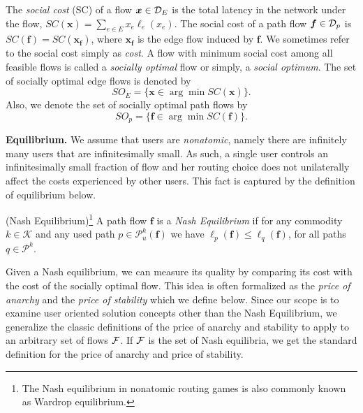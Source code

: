 \begin{definition}
The \emph{social cost} (SC) of a flow $\bm{x} \in \mathcal{D}_E$ is the total latency in the network under the flow, $SC(\bm{x})=\sum_{e\in E}x_e \ell_{e}(x_e)$. The social cost of a path flow $\bm{f} \in \mathcal{D}_p$ is $SC(\bm{f})=SC(\bm{x_f})$, where $\bm{x_f}$ is the edge flow induced by $\bm{f}$.  We sometimes refer to the social cost simply as {\em cost}.
A flow with minimum social cost among all feasible flows is called a \emph{socially optimal} flow or simply, a \emph{social optimum}.  The set of socially optimal edge flows is denoted by 
$$SO_E = \{\bm{x} \in \arg\min SC(\bm{x}) \}.$$
Also, we denote the set of socially optimal path flows by
$$ SO_p= \{\bm{f} \in \arg\min SC(\bm{f}) \}.$$
\end{definition}

\smallskip\noindent 
\textbf{Equilibrium.} We assume that users are {\em nonatomic}, namely there are infinitely many users that are infinitesimally small.  As such, a single user controls an infinitesimally small fraction of flow and her routing choice does not unilaterally affect the costs experienced by other users.  This fact is captured by the definition of equilibrium below.

\begin{definition} (Nash Equilibrium)\footnote{The Nash equilibrium in nonatomic routing games is also commonly known as Wardrop equilibrium. }
A path flow $\bm{f}$ is a  \emph{Nash Equilibrium} if for any commodity $k\in \mathcal{K}$ and any used path $p\in \mathcal{P}_{u}^k(\bm{f})$ we have $\ell_p(\bm{f}) \leq  \ell_q(\bm{f})$, for all paths $q\in \mathcal{P}^k$. 
\end{definition}

Given a Nash equilibrium, we can measure its quality by comparing its cost with the cost of the socially optimal flow.  This idea is often formalized as the \emph{price of anarchy} and the \emph{price of stability} which we define below. Since our scope is to examine user oriented solution concepts other than  the Nash Equilibrium, we generalize the classic definitions of the price of anarchy and stability to apply to an arbitrary set of flows $\mathcal{F}$. If $\mathcal{F}$ is the set of Nash equilibria, we get the standard definition for the price of anarchy and price of stability.

